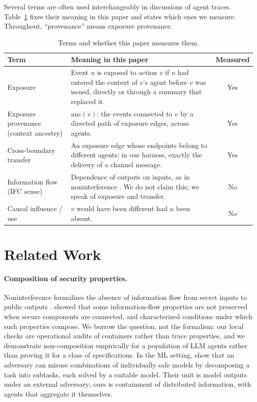 \documentclass[11pt, a4paper]{article}
\theoremstyle{definition}
\begin{document}
Several terms are often used interchangeably in discussions of agent traces. Table~\ref{tab:terms} fixes their meaning in this paper and states which ones we measure. Throughout, ``provenance'' means exposure provenance.

\begin{table}[t]
\centering
\small
\caption{Terms and whether this paper measures them.}
\label{tab:terms}
\begin{tabularx}{\linewidth}{lXc}
\toprule
Term & Meaning in this paper & Measured \\
\midrule
Exposure & Event $u$ is exposed to action $v$ if $u$ had entered the context of $v$'s agent before $v$ was issued, directly or through a summary that replaced it. & Yes \\
Exposure provenance (context ancestry) & $\mathrm{anc}(v)$: the events connected to $v$ by a directed path of exposure edges, across agents. & Yes \\
Cross-boundary transfer & An exposure edge whose endpoints belong to different agents; in our harness, exactly the delivery of a channel message. & Yes \\
Information flow (IFC sense) & Dependence of outputs on inputs, as in noninterference \citep{goguen1982}. We do not claim this; we speak of exposure and transfer. & No \\
Causal influence / use & $v$ would have been different had $u$ been absent. & No \\
\bottomrule
\end{tabularx}
\end{table}

\section{Related Work}
\label{sec:related}

\paragraph{Composition of security properties.} Noninterference formalizes the absence of information flow from secret inputs to public outputs \citep{goguen1982}. \citet{mccullough1987} showed that some information-flow properties are not preserved when secure components are connected, and \citet{mantel2002} characterized conditions under which such properties compose. We borrow the question, not the formalism: our local checks are operational audits of containers rather than trace properties, and we demonstrate non-composition empirically for a population of LLM agents rather than proving it for a class of specifications. In the ML setting, \citet{jones2025combinations} show that an adversary can misuse combinations of individually safe models by decomposing a task into subtasks, each solved by a suitable model. Their unit is model outputs under an external adversary; ours is containment of distributed information, with agents that aggregate it themselves.
\end{document}
